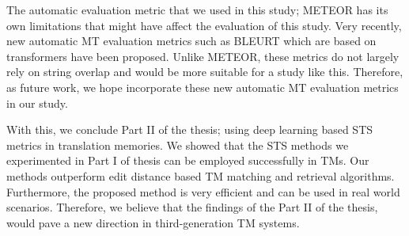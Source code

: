 The automatic evaluation metric that we used in this study; METEOR has its own limitations that might have affect the evaluation of this study. Very recently, new automatic MT evaluation metrics such as BLEURT \cite{sellam-etal-2020-bleurt} which are based on transformers have been proposed. Unlike METEOR, these metrics do not largely rely on string overlap and would be more suitable for a study like this. Therefore, as future work, we hope incorporate these new automatic MT evaluation metrics in our study.

With this, we conclude Part II of the thesis; using deep learning based STS metrics in translation memories. We showed that the STS methods we experimented in Part I of thesis can be employed successfully in TMs. Our methods outperform edit distance based TM matching and retrieval algorithms. Furthermore, the proposed method is very efficient and can be used in real world scenarios. Therefore, we believe that the findings of the Part II of the thesis, would pave a new direction in third-generation TM systems.

 

